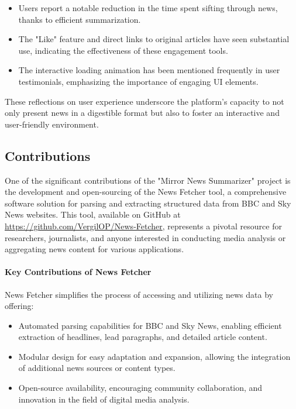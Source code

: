 \documentclass[10pt]{article}
\begin{document}
\begin{itemize}
    \item Users report a notable reduction in the time spent sifting through news, thanks to efficient summarization.
    \item The "Like" feature and direct links to original articles have seen substantial use, indicating the effectiveness of these engagement tools.
    
    \item The interactive loading animation has been mentioned frequently in user testimonials, emphasizing the importance of engaging UI elements.
    
\end{itemize}

These reflections on user experience underscore the platform's capacity to not only present news in a digestible format but also to foster an interactive and user-friendly environment.

\subsection{Contributions}

One of the significant contributions of the "Mirror News Summarizer" project is the development and open-sourcing of the News Fetcher tool, a comprehensive software solution for parsing and extracting structured data from BBC and Sky News websites. This tool, available on GitHub at \url{https://github.com/VergilOP/News-Fetcher}, represents a pivotal resource for researchers, journalists, and anyone interested in conducting media analysis or aggregating news content for various applications.

\paragraph{Key Contributions of News Fetcher}
News Fetcher simplifies the process of accessing and utilizing news data by offering:
\begin{itemize}
    \item Automated parsing capabilities for BBC and Sky News, enabling efficient extraction of headlines, lead paragraphs, and detailed article content.
    \item Modular design for easy adaptation and expansion, allowing the integration of additional news sources or content types.
    \item Open-source availability, encouraging community collaboration, and innovation in the field of digital media analysis.
\end{itemize}
\end{document}
